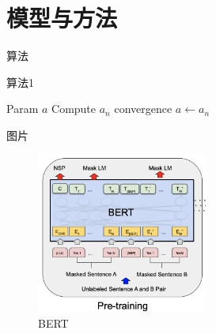 \documentclass[hyperref,UTF8,11pt]{beamer}
\begin{document}
\section{模型与方法}

\begin{frame}{算法}
    \begin{algorithm}[H]
        \caption{算法1}\label{alg:em}
        \begin{algorithmic}[1]
            \REQUIRE Param
            \ENSURE $a$
            \REPEAT
            \STATE Compute $a_n$
            \UNTIL convergence
            \RETURN $a\leftarrow a_n$
        \end{algorithmic}
    \end{algorithm}    
\end{frame}

\begin{frame}{图片}
    \begin{figure}
        \centering
        \includegraphics[width=0.5\textwidth]{BERT.png}
        \caption{BERT}\label{fig:bert}
    \end{figure}
\end{frame}
\end{document}
